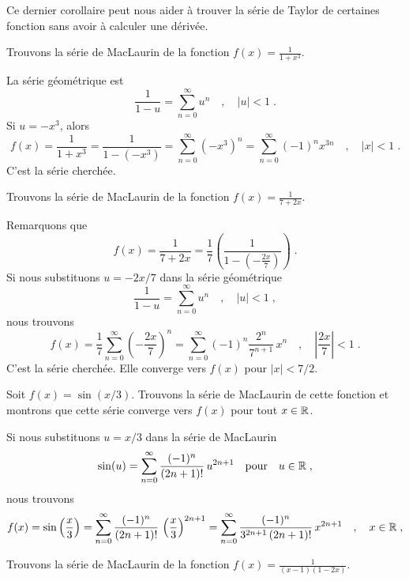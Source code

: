 {Ce dernier corollaire peut nous aider à trouver la série de Taylor de
certaines fonction sans avoir à calculer une dérivée.

\begin{egg}
Trouvons la série de MacLaurin de la fonction
$\displaystyle f(x) = \frac{1}{1+x^3}$.

La série géométrique est
\[
\frac{1}{1-u} = \sum_{n=0}^\infty u^n \quad , \quad |u|<1 \; .
\]
Si $u=-x^3$, alors
\[
f(x) = \frac{1}{1+x^3} = \frac{1}{1-\left(-x^3\right)}
= \sum_{n=0}^\infty \left(-x^3\right)^n
= \sum_{n=0}^\infty (-1)^n x^{3n} \quad , \quad |x|<1 \; .
\]
C'est la série cherchée.
\end{egg}

\begin{egg}
Trouvons la série de MacLaurin de la fonction
$\displaystyle f(x) = \frac{1}{7+2x}$.

Remarquons que
\[
f(x) = \frac{1}{7+2x} = \frac{1}{7}
\left( \frac{1}{1-\left(-\frac{2x}{7}\right)} \right) \; .
\]
Si nous substituons $u= -2x/7$ dans la série géométrique
\[
\frac{1}{1-u} = \sum_{n=0}^\infty u^n \quad , \quad |u|<1 \; ,
\]
nous trouvons
\[
f(x) = \frac{1}{7} \sum_{n=0}^\infty \left(-\frac{2x}{7}\right)^n
= \sum_{n=0}^\infty (-1)^n \frac{2^n}{7^{n+1}} \, x^n
\quad , \quad \left|\frac{2x}{7}\right| <1 \; .
\]
C'est la série cherchée.  Elle converge vers $f(x)$ pour $|x| < 7/2$.
\end{egg}

\begin{egg}
Soit $f(x) = \sin(x/3)$.  Trouvons la série de MacLaurin de
cette fonction et montrons que cette série converge vers $f(x)$ pour tout
$x\in \mathbb{R}$.

Si nous substituons $u=x/3$ dans la série de MacLaurin
\[
\sin(u) = \sum_{n=0}^\infty \frac{(-1)^n}{(2n+1)!}\, u^{2n+1} \quad
\text{pour} \quad u \in \mathbb{R} \; ,
\]
nous trouvons
\[
f(x) = \sin\left(\frac{x}{3}\right)
= \sum_{n=0}^\infty \frac{(-1)^n}{(2n+1)!}\,
\left(\frac{x}{3}\right)^{2n+1}
= \sum_{n=0}^\infty \frac{(-1)^n}{3^{2n+1}\,(2n+1)!}\,x^{2n+1}
\quad , \quad x\in \mathbb{R} \; ,
\]
\end{egg}

\begin{egg}
Trouvons la série de MacLaurin de la fonction
$\displaystyle f(x) = \frac{1}{(x-1)(1-2x)}$.


\end{egg}}
